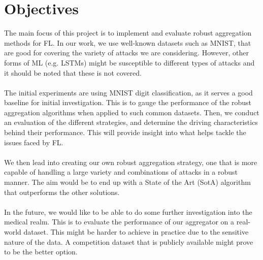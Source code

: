 \section{Objectives}
The main focus of this project is to implement and evaluate robust aggregation methods for FL.
In our work, we use well-known datasets such as MNIST, that are good for covering the variety of attacks we are considering.
However, other forms of ML (e.g. LSTMs) might be susceptible to different types of attacks and it should be noted that these is not covered.
\\ \\
The initial experiments are using MNIST \cite{mnist} digit classification, as it serves a good baseline for initial investigation.  This is to gauge the performance of the robust aggregation algorithms when applied to such common datasets.
Then, we conduct an evaluation of the different strategies, and determine the driving characteristics behind their performance. This will provide insight into what helps tackle the issues faced by FL.
\\ \\
We then lead into creating our own robust aggregation strategy, one that is more capable of handling a large variety and combinations of attacks in a robust manner.
The aim would be to end up with a State of the Art (SotA) algorithm that outperforms the other solutions.
\\ \\
In the future, we would like to be able to do some further investigation into the medical realm. This is to evaluate the performance of our aggregator on a real-world dataset.
This might be harder to achieve in practice due to the sensitive nature of the data. A competition dataset that is publicly available might prove to be the better option.

